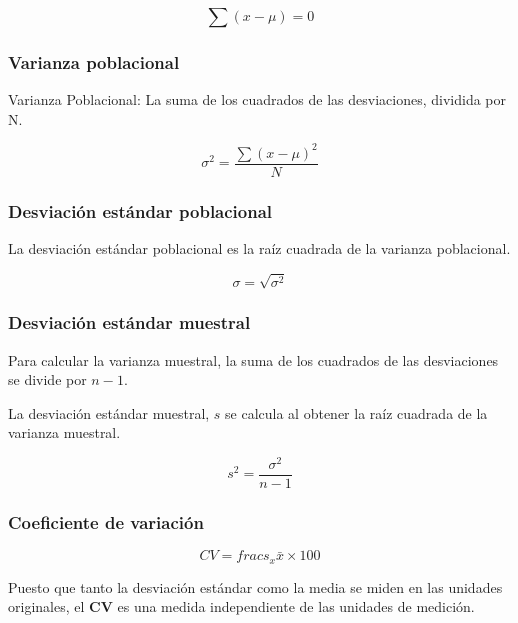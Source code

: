 \begin{equation}
    \sum (x-\mu)=0
\end{equation}

\subsubsection{Varianza poblacional}

Varianza Poblacional: La suma de los cuadrados
de las desviaciones, dividida por N.

\begin{equation}
    \sigma^2=\frac{\sum (x-\mu)^2}{N}
\end{equation}

\subsubsection{Desviación estándar poblacional}

La desviación estándar poblacional es la raíz cuadrada
de la varianza poblacional.


\begin{equation}
    \sigma=\sqrt{\sigma^2}
\end{equation}

\subsubsection{Desviación estándar muestral}

Para calcular la varianza muestral, la suma de los
cuadrados de las desviaciones se divide por $n-1$.

La desviación estándar muestral, $s$ se calcula al obtener la raíz
cuadrada de la varianza muestral.

\begin{equation}
    s^2=\frac{\sigma^2}{n-1}
\end{equation}

\subsubsection{Coeficiente de variación}

\begin{equation}
    CV=frac{s_x}{\bar{x}}\times 100
\end{equation}

Puesto que tanto la desviación estándar como la
media se miden en las unidades originales, el \textbf{CV} es
una medida independiente de las unidades de
medición.


